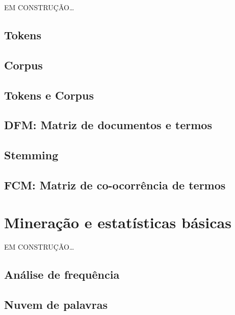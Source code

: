 \documentclass[]{book}
\begin{document}
EM CONSTRUÇÃO\ldots{}

\hypertarget{tokens}{%
\section{Tokens}\label{tokens}}

\hypertarget{corpus}{%
\section{Corpus}\label{corpus}}

\hypertarget{tokens-e-corpus}{%
\section{Tokens e Corpus}\label{tokens-e-corpus}}

\hypertarget{dfm-matriz-de-documentos-e-termos}{%
\section{DFM: Matriz de documentos e termos}\label{dfm-matriz-de-documentos-e-termos}}

\hypertarget{stemming}{%
\section{Stemming}\label{stemming}}

\hypertarget{fcm-matriz-de-co-ocorruxeancia-de-termos}{%
\section{FCM: Matriz de co-ocorrência de termos}\label{fcm-matriz-de-co-ocorruxeancia-de-termos}}

\hypertarget{stat}{%
\chapter{Mineração e estatísticas básicas}\label{stat}}

EM CONSTRUÇÃO\ldots{}

\hypertarget{anuxe1lise-de-frequuxeancia}{%
\section{Análise de frequência}\label{anuxe1lise-de-frequuxeancia}}

\hypertarget{nuvem-de-palavras}{%
\section{Nuvem de palavras}\label{nuvem-de-palavras}}
\end{document}

